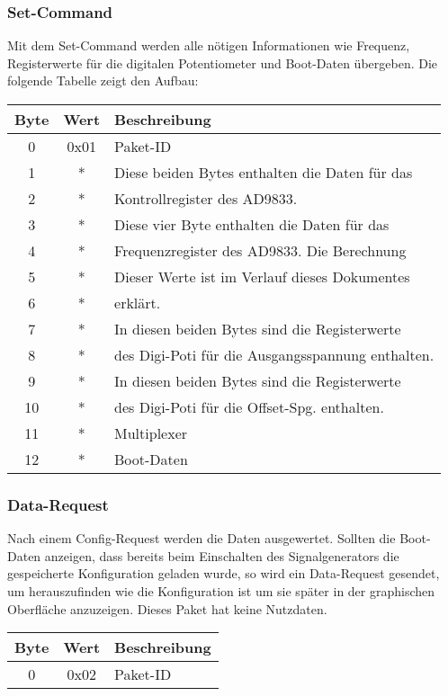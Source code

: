 \subsubsection*{Set-Command}
Mit dem Set-Command werden alle nötigen Informationen wie Frequenz, Registerwerte für die digitalen Potentiometer und Boot-Daten übergeben. Die folgende Tabelle zeigt den Aufbau:
\linebreak

\begin{flushleft}
\begin{tabular}{c||c|l}
Byte & Wert & Beschreibung \\
\hline
\hline
0 & 0x01 & Paket-ID \\
\hline
1 & * & Diese beiden Bytes enthalten die Daten für das \\
2 & * & Kontrollregister des AD9833.\\
\hline
3 & * & Diese vier Byte enthalten die Daten für das \\
4 & * & Frequenzregister des AD9833. Die Berechnung \\
5 & * & Dieser Werte ist im Verlauf dieses Dokumentes \\
6 & * & erklärt.\\
\hline
7 & * & In diesen beiden Bytes sind die Registerwerte \\
8 & * & des Digi-Poti für die Ausgangsspannung enthalten.\\
\hline
9 & * & In diesen beiden Bytes sind die Registerwerte \\
10 & * & des Digi-Poti für die Offset-Spg. enthalten.\\
\hline
11 & * & Multiplexer\\
\hline
12 & * & Boot-Daten\\

\end{tabular}
\end{flushleft}

\subsubsection*{Data-Request}
Nach einem Config-Request werden die Daten ausgewertet. Sollten die Boot-Daten anzeigen, dass bereits beim Einschalten des Signalgenerators die gespeicherte Konfiguration geladen wurde, so wird ein Data-Request gesendet, um herauszufinden wie die Konfiguration ist um sie später in der graphischen Oberfläche anzuzeigen. Dieses Paket hat keine Nutzdaten.
\begin{flushleft}
\begin{tabular}{c||c|l}
Byte & Wert & Beschreibung \\
\hline
\hline
0 & 0x02 & Paket-ID \\

\end{tabular}
\end{flushleft}

